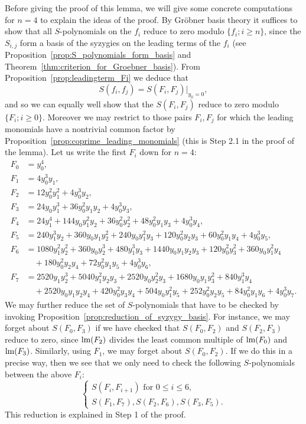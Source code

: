 Before giving the proof of this lemma, we will give some concrete computations for $n=4$ to explain the ideas of the proof. By Gr\"obner basis theory it suffices to show that all $S$-polynomials on the $f_i$ reduce to zero modulo $\{f_i; i\geq n\}$, since the $S_{i,j}$ form a basis of the syzygies on the leading terms of the $f_i$ (see Proposition~\ref{prop:S_polynomials_form_basis} and Theorem~\ref{thm:criterion_for_Groebner_basis}). From Proposition~\ref{prop:leadingterm_Fi} we deduce that
\[  S(f_i,f_j) = S(F_i,F_j)|_{y_0=0}, \]
and so we can equally well show that the $S(F_i,F_j)$ reduce to zero modulo $\{F_i; i\geq 0\}$. Moreover we may restrict to those pairs $F_i,F_j$ for which the leading monomials have a nontrivial common factor by Proposition~\ref{prop:coprime_leading_monomials} (this is Step 2.1 in the proof of the lemma). Let us write the first $F_i$ down for $n=4$:
\begin{align*}
F_0 & = y_0^4 , \\
F_1 & = 4 y_0^3y_1, \\
F_2 & = 12y_0^2y_1^2 + 4 y_0^3 y_2, \\
F_3 & = 24 y_0y_1^3  + 36y_0^2 y_1 y_2 + 4y_0^3 y_3 , \\
F_4 & = 24y_1^4  + 144 y_0y_1^2y_2  + 36y_0^2y_2^2 + 48y_0^2y_1y_3 + 4 y_0^3y_4 , \\
F_5 & = 240 y_1^3 y_2 + 360y_0y_1y_2^2  + 240y_0y_1^2y_3 + 120 y_0^2y_2y_3 + 60 y_0^2y_1y_4 + 4y_0^3y_5 , \\
F_6 & =  1080 y_1^2 y_2^2  + 360 y_0 y_2^3  + 480 y_1^3 y_3  + 1440y_0y_1y_2y_3  + 120 y_0^2y_3^2  + 360 y_0y_1^2y_4 \\
    & \quad  + 180 y_0^2y_2y_4 + 72y_0^2y_1y_5           + 4 y_0^3y_6, \\
F_7 & =   2520y_1 y_2^3   + 5040 y_1^2y_2y_3  + 2520 y_0 y_2^2 y_3+ 1680 y_0y_1y_3^2  +  840 y_1^3y_4 \\
    & \quad + 2520 y_0y_1y_2y_4  + 420 y_0^2y_3y_4 + 504 y_0y_1^2y_5 + 252 y_0^2y_2y_5 + 84 y_0^2y_1y_6 + 4 y_0^3 y_7 .
\end{align*}
We may further reduce the set of $S$-polynomials that have to be checked by invoking Proposition~\ref{prop:reduction_of_syzygy_basis}. For instance, we may forget about $S(F_0,F_3)$ if we have checked that $S(F_0,F_2)$ and $S(F_2,F_3)$ reduce to zero, since $\textnormal{lm}(F_2)$ divides the least common multiple of $\textnormal{lm}(F_0)$ and $\textnormal{lm}(F_3)$. Similarly, using $F_1$, we may forget about $S(F_0,F_2)$. If we do this in a precise way, then we see that we only need to check the following $S$-polynomials between the above $F_i$:
\[ \left\{ \begin{array}{l} S(F_i,F_{i+1}) \text{ for } 0\leq i\leq 6, \\
S(F_1,F_7), S(F_2,F_6) , S(F_3,F_5).
\end{array} \right.  \]
This reduction is explained in Step 1 of the proof.

